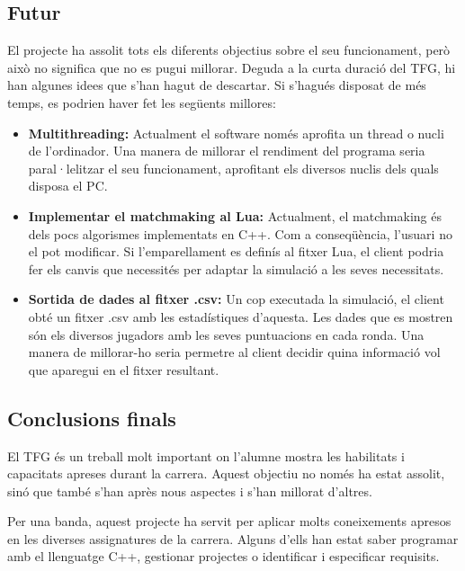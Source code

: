 \documentclass[a4paper]{article}
\begin{document}
\subsection{Futur}

El projecte ha assolit tots els diferents objectius sobre el seu funcionament, però això no significa que no es pugui millorar. Deguda a la curta duració del TFG, hi han algunes idees que s'han hagut de descartar. Si s'hagués disposat de més temps, es podrien haver fet les següents millores:

\begin{itemize}
    \item \textbf{Multithreading:} Actualment el software només aprofita un thread o nucli de l'ordinador. Una manera de millorar el rendiment del programa seria paral·lelitzar el seu funcionament, aprofitant els diversos nuclis dels quals disposa el PC.
    
    \item \textbf{Implementar el matchmaking al Lua:} Actualment, el matchmaking és dels pocs algorismes implementats en C++. Com a conseqüència, l'usuari no el pot modificar. Si l'emparellament es definís al fitxer Lua, el client podria fer els canvis que necessités per adaptar la simulació a les seves necessitats.
    
    \item \textbf{Sortida de dades al fitxer .csv:} Un cop executada la simulació, el client obté un fitxer .csv amb les estadístiques d'aquesta. Les dades que es mostren són els diversos jugadors amb les seves puntuacions en cada ronda. Una manera de millorar-ho seria permetre al client decidir quina informació vol que aparegui en el fitxer resultant.
\end{itemize}

\subsection{Conclusions finals}

El TFG és un treball molt important on l'alumne mostra les habilitats i capacitats apreses durant la carrera. Aquest objectiu no només ha estat assolit, sinó que també s'han après nous aspectes i s'han millorat d'altres.

Per una banda, aquest projecte ha servit per aplicar molts coneixements apresos en les diverses assignatures de la carrera. Alguns d'ells han estat saber programar amb el llenguatge C++, gestionar projectes o identificar i especificar requisits.
\end{document}
